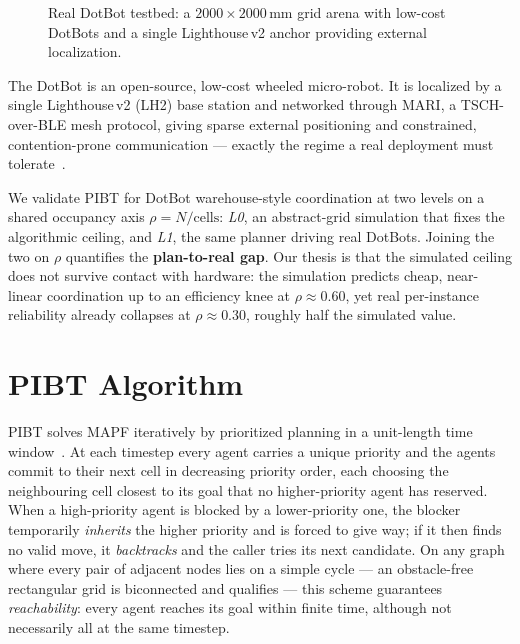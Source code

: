 \begin{figure}
    \centering
    \fbox{\rule{0pt}{3cm}\hspace{0.85\columnwidth}}%
    \caption{Real DotBot testbed: a $2000\times2000$\,mm grid arena with low-cost
             DotBots and a single Lighthouse\,v2 anchor providing external localization.}
    \label{fig:demo_setup}
\end{figure}
The DotBot is an open-source, low-cost wheeled micro-robot. It is localized by a single
Lighthouse\,v2 (LH2) base station and networked through MARI, a TSCH-over-BLE mesh
protocol, giving sparse external positioning and constrained, contention-prone
communication --- exactly the regime a real deployment must tolerate~\cite{alvarado24dotbot}.

We validate PIBT for DotBot warehouse-style coordination at two levels on a shared
occupancy axis $\rho = N/\text{cells}$: \emph{L0}, an abstract-grid simulation that
fixes the algorithmic ceiling, and \emph{L1}, the same planner driving real DotBots.
Joining the two on $\rho$ quantifies the \textbf{plan-to-real gap}.
Our thesis is that the simulated ceiling does not survive contact with hardware: the
simulation predicts cheap, near-linear coordination up to an efficiency knee at
$\rho \approx 0.60$, yet real per-instance reliability already collapses at
$\rho \approx 0.30$, roughly half the simulated value.

\section{PIBT Algorithm}
\label{sec:pbit}
PIBT solves MAPF iteratively by prioritized planning in a unit-length time
window~\cite{okumura22priority}. At each timestep every agent carries a unique priority
and the agents commit to their next cell in decreasing priority order, each choosing the
neighbouring cell closest to its goal that no higher-priority agent has reserved. When a
high-priority agent is blocked by a lower-priority one, the blocker temporarily
\emph{inherits} the higher priority and is forced to give way; if it then finds no valid
move, it \emph{backtracks} and the caller tries its next candidate. On any graph where
every pair of adjacent nodes lies on a simple cycle --- an obstacle-free rectangular grid
is biconnected and qualifies --- this scheme guarantees \emph{reachability}: every agent
reaches its goal within finite time, although not necessarily all at the same timestep.

